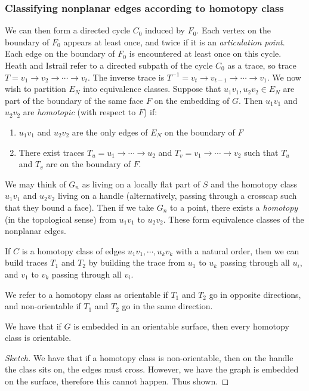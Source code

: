 \subsubsection{Classifying nonplanar edges according to homotopy class}

We can then form a directed cycle \(C_0\) induced by \(F_0\). Each vertex on the boundary of \(F_0\) appears at least once, and twice if it is an \textit{articulation point}. Each edge on the boundary of \(F_0\) is encountered at least once on this cycle. Heath and Istrail refer to a directed subpath of the cycle \(C_0\) as a trace, so trace \(T = v_1 \rightarrow v_2 \rightarrow \cdots \rightarrow v_t\). The inverse trace is \(T^{-1} = v_t \rightarrow v_{t-1} \rightarrow \cdots \rightarrow v_1\). We now wish to partition \(E_N\) into equivalence classes. Suppose that \(u_1v_1, u_2v_2 \in E_N\) are part of the boundary of the same face \(F\) on the embedding of \(G\). Then \(u_1v_1\) and \(u_2v_2\) are \textit{homotopic} (with respect to \(F\)) if:
\begin{enumerate}
	\item \(u_1v_1\) and \(u_2v_2\) are the only edges of \(E_N\) on the boundary of \(F\)
	\item There exist traces \(T_u = u_1 \rightarrow \cdots \rightarrow u_2\) and \(T_v = v_1 \rightarrow \cdots \rightarrow v_2\) such that \(T_u\) and \(T_v\) are on the boundary of \(F\).
\end{enumerate}
We may think of \(G_n\) as living on a locally flat part of \(S\) and the homotopy class \(u_1v_1\) and \(u_2 v_2\) living on a handle (alternatively, passing through a crosscap such that they bound a face). Then if we take \(G_n\) to a point, there exists a \textit{homotopy} (in the topological sense) from \(u_1v_1\) to \(u_2v_2\). These form equivalence classes of the nonplanar edges.

\begin{lemma}
	If \(C\) is a homotopy class of edges \(u_1v_1, \cdots, u_kv_k\) with a natural order, then we can build traces \(T_1\) and \(T_2\) by building the trace from \(u_1\) to \(u_k\) passing through all \(u_i\), and \(v_1\) to \(v_k\) passing through all \(v_i\). 
\end{lemma}
We refer to a homotopy class as orientable if \(T_1\) and \(T_2\) go in opposite directions, and non-orientable if \(T_1\) and \(T_2\) go in the same direction.

\begin{lemma}
	We have that if \(G\) is embedded in an orientable surface, then every homotopy class is orientable.
\end{lemma}
\begin{proof}[Sketch]
	We have that if a homotopy class is non-orientable, then on the handle the class sits on, the edges must cross. However, we have the graph is embedded on the surface, therefore this cannot happen. Thus shown. 
\end{proof}

